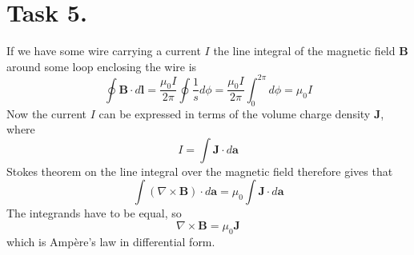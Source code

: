 \documentclass[a4paper,11pt]{article}
\begin{document}
\section*{Task 5.}
\begin{alphalist}
    \item If we have some wire carrying a current $I$ the line integral of the magnetic field $\mathbf{B}$ around some 
        loop enclosing the wire is
        \[
            \oint \mathbf{B} \cdot d\mathbf{l} = \frac{\mu_0I}{2\pi} \oint \frac{1}{s} d\phi = \frac{\mu_0 I}{2\pi} \int_0^{2\pi} d\phi = \mu_0 I
        \]
        Now the current $I$ can be expressed in terms of the volume charge density $\mathbf{J}$, where
        \[
            I = \int \mathbf{J} \cdot d\mathbf{a}
        \]
        Stokes theorem on the line integral over the magnetic field therefore gives that
        \[
            \int \left(\nabla \times \mathbf{B}\right) \cdot d\mathbf{a} = \mu_0 \int \mathbf{J} \cdot d\mathbf{a}
        \]
        The integrands have to be equal, so
        \[
            \nabla \times \mathbf{B} = \mu_0 \mathbf{J}
        \]
        which is Ampère's law in differential form.
\end{alphalist}
\end{document}
